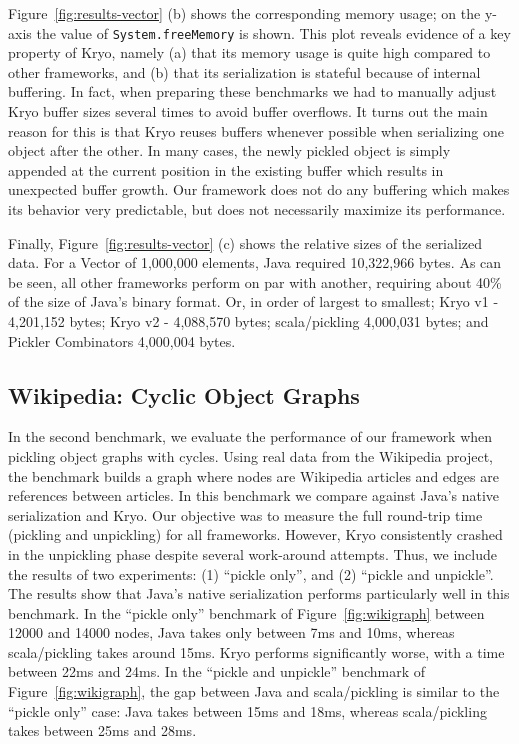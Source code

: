 \documentclass[10pt]{sigplanconf}
\theoremstyle{definition}
\theoremstyle{definition}
\begin{document}
Figure~\ref{fig:results-vector} (b) shows the corresponding memory usage; on the
y-axis the value of \texttt{System.freeMemory} is shown. This plot
reveals evidence of a key property of Kryo, namely (a) that its memory usage
is quite high compared to other frameworks, and (b) that its
serialization is stateful because of internal buffering. In fact, when
preparing these benchmarks we had to manually adjust Kryo buffer sizes
several times to avoid buffer overflows. It turns out the main reason
for this is that Kryo reuses buffers whenever possible when
serializing one object after the other. In many cases, the
newly pickled object is simply appended at the current position in the
existing buffer which results in unexpected buffer growth. Our
framework does not do any buffering which makes its behavior very
predictable, but does not necessarily maximize its performance.

Finally, Figure~\ref{fig:results-vector} (c) shows the relative sizes of the serialized data. For a Vector of 1,000,000 elements, Java required 10,322,966 bytes. As can be seen, all other frameworks perform on par with another, requiring about 40\% of the size of Java's binary format. Or, in order of largest to smallest; Kryo v1 - 4,201,152 bytes; Kryo v2 - 4,088,570 bytes; scala/pickling 4,000,031 bytes; and Pickler Combinators 4,000,004 bytes.

\subsection{Wikipedia: Cyclic Object Graphs}

In the second benchmark, we evaluate the performance of our framework when
pickling object graphs with cycles. Using real data from the Wikipedia
project, the benchmark builds a graph where nodes are Wikipedia articles and
edges are references between articles. In this benchmark we compare against
Java's native serialization and Kryo. Our objective was to measure the full
round-trip time (pickling and unpickling) for all frameworks. However, Kryo
consistently crashed in the unpickling phase despite several work-around
attempts. Thus, we include the results of two experiments: (1) ``pickle
only'', and (2) ``pickle and unpickle''. The results show that Java's native
serialization performs particularly well in this benchmark. In the ``pickle
only'' benchmark of Figure~\ref{fig:wikigraph} between 12000 and 14000 nodes, Java takes only between 7ms and
10ms, whereas scala/pickling takes around 15ms. Kryo performs significantly
worse, with a time between 22ms and 24ms. In the ``pickle and unpickle''
benchmark of Figure~\ref{fig:wikigraph}, the gap between Java and scala/pickling is similar to the ``pickle
only'' case: Java takes between 15ms and 18ms, whereas scala/pickling takes
between 25ms and 28ms.
\end{document}
